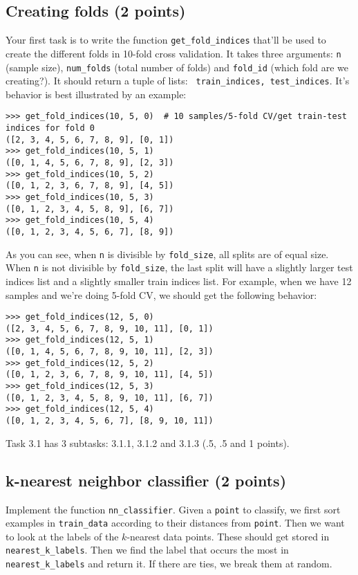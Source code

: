 \documentclass{article}
\begin{document}
\subsection{Creating folds (2 points)}

Your first task is to write the function {\tt get\_fold\_indices} that'll be used to create the different folds in 10-fold cross validation. It takes three arguments:
{\tt n} (sample size), {\tt num\_folds} (total number of folds) and {\tt fold\_id} (which fold are we creating?). It should return a tuple of lists: {\tt
train\_indices, test\_indices}. It's behavior is best illustrated by an example:
\begin{verbatim}
>>> get_fold_indices(10, 5, 0)  # 10 samples/5-fold CV/get train-test indices for fold 0
([2, 3, 4, 5, 6, 7, 8, 9], [0, 1])
>>> get_fold_indices(10, 5, 1)
([0, 1, 4, 5, 6, 7, 8, 9], [2, 3])
>>> get_fold_indices(10, 5, 2)
([0, 1, 2, 3, 6, 7, 8, 9], [4, 5])
>>> get_fold_indices(10, 5, 3)
([0, 1, 2, 3, 4, 5, 8, 9], [6, 7])
>>> get_fold_indices(10, 5, 4)
([0, 1, 2, 3, 4, 5, 6, 7], [8, 9])
\end{verbatim}

As you can see, when {\tt n} is divisible by {\tt fold\_size}, all splits are of equal size. When {\tt n} is not divisible by {\tt fold\_size}, the last split will have a slightly larger
test indices list and a slightly smaller train indices list. For example, when we have 12 samples and we're doing 5-fold CV, we should get the following behavior:
\begin{verbatim}
>>> get_fold_indices(12, 5, 0)
([2, 3, 4, 5, 6, 7, 8, 9, 10, 11], [0, 1])
>>> get_fold_indices(12, 5, 1)
([0, 1, 4, 5, 6, 7, 8, 9, 10, 11], [2, 3])
>>> get_fold_indices(12, 5, 2)
([0, 1, 2, 3, 6, 7, 8, 9, 10, 11], [4, 5])
>>> get_fold_indices(12, 5, 3)
([0, 1, 2, 3, 4, 5, 8, 9, 10, 11], [6, 7])
>>> get_fold_indices(12, 5, 4)
([0, 1, 2, 3, 4, 5, 6, 7], [8, 9, 10, 11])
\end{verbatim}

Task 3.1 has 3 subtasks: 3.1.1, 3.1.2 and 3.1.3 (.5, .5 and 1 points).

\subsection{k-nearest neighbor classifier (2 points)}

Implement the function {\tt nn\_classifier}. Given a {\tt point} to classify, we first sort examples in {\tt train\_data} according to their distances from {\tt point}. Then we
want to look at the labels of the $k$-nearest data points. These should get stored in {\tt nearest\_k\_labels}. Then we find the label that occurs the most in 
{\tt nearest\_k\_labels} and return it. If there are ties, we break them at random.
\end{document}
